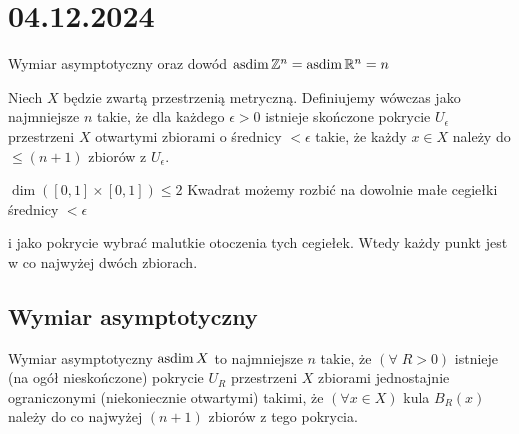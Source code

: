\section{04.12.2024}{Wymiar asymptotyczny oraz dowód $\operatorname{asdim} \mathbb{Z}^n=\operatorname{asdim}\mathbb{R}^n= n$}

Niech $X$ będzie zwartą przestrzenią metryczną. Definiujemy wówczas  jako najmniejsze $n$ takie, że dla każdego $\epsilon>0$ istnieje skończone pokrycie $U_\epsilon$ przestrzeni $X$ otwartymi zbiorami o średnicy $<\epsilon$ takie, że każdy $x\in X$ należy do $\leq (n+1)$ zbiorów z $U_\epsilon$.

\begin{example}
  $\dim([0,1]\times[0,1])\leq 2$
  Kwadrat możemy rozbić na dowolnie małe cegiełki średnicy $<\epsilon$
  \begin{center}
  \end{center}
  i jako pokrycie wybrać malutkie otoczenia tych cegiełek. Wtedy każdy punkt jest w co najwyżej dwóch zbiorach.
\end{example}

\subsection{Wymiar asymptotyczny}

\begin{definition}{}{}
  Wymiar asymptotyczny $\operatorname{asdim} X$ to najmniejsze $n$ takie, że $(\forall\;R>0)$ istnieje (na ogół nieskończone) pokrycie $U_R$ przestrzeni $X$ zbiorami jednostajnie ograniczonymi (niekoniecznie otwartymi) takimi, że $(\forall x\in X)$ kula $B_R(x)$ należy do co najwyżej $(n+1)$ zbiorów z tego pokrycia.
\end{definition}

